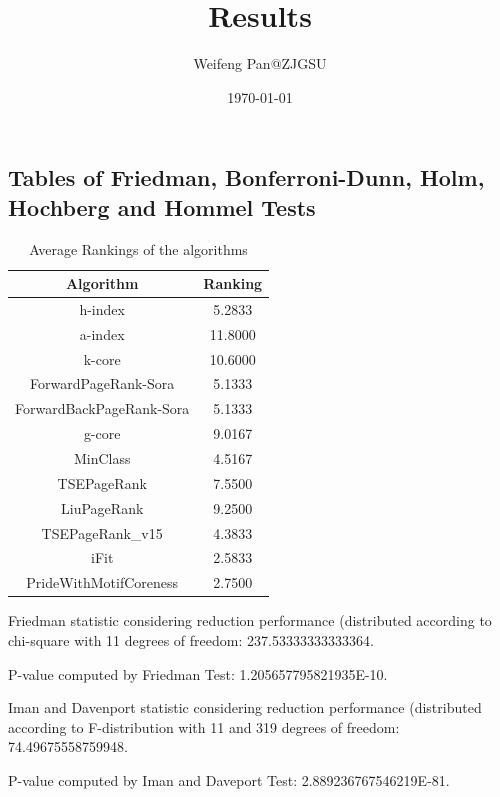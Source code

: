 \documentclass[a4paper,10pt]{article}
\title{Results}
\author{Weifeng Pan@ZJGSU}
\date{\today}
\begin{document}
\begin{landscape}
\oddsidemargin 0in \topmargin 0in\maketitle
\section{Tables of Friedman, Bonferroni-Dunn, Holm, Hochberg and Hommel Tests}
\begin{table}[!htp]
\centering
\caption{Average Rankings of the algorithms
}\begin{tabular}{c|c}
Algorithm&Ranking\\
\hline
h-index&5.2833\\
a-index&11.8000\\
k-core&10.6000\\
ForwardPageRank-Sora&5.1333\\
ForwardBackPageRank-Sora&5.1333\\
g-core&9.0167\\
MinClass&4.5167\\
TSEPageRank&7.5500\\
LiuPageRank&9.2500\\
TSEPageRank_v15&4.3833\\
iFit&2.5833\\
PrideWithMotifCoreness&2.7500\\
\end{tabular}
\end{table}


Friedman statistic considering reduction performance (distributed according to chi-square with 11 degrees of freedom: 237.53333333333364.


P-value computed by Friedman Test: 1.205657795821935E-10.\newline

Iman and Davenport statistic considering reduction performance (distributed according to F-distribution with 11 and 319 degrees of freedom: 74.49675558759948.


P-value computed by Iman and Daveport Test: 2.889236767546219E-81.\newline


\end{landscape}
\end{document}
